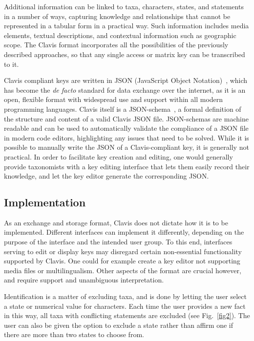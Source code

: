 \documentclass[10pt,letterpaper]{article}
\begin{document}
Additional information can be linked to taxa, characters, states, and statements in a number of ways, capturing knowledge and relationships that cannot be represented in a tabular form in a practical way. Such information includes media elements, textual descriptions, and contextual information such as geographic scope. The Clavis format incorporates all the possibilities of the previously described approaches, so that any single access or matrix key can be transcribed to it.

Clavis compliant keys are written in JSON (JavaScript Object Notation)~\cite{JSON}, which has become the \textit{de facto} standard for data exchange over the internet, as it is an open, flexible format with widespread use and support within all modern programming languages. Clavis itself is a JSON-schema~\cite{JSON_schema}, a formal definition of the structure and content of a valid Clavis JSON file. JSON-schemas are machine readable and can be used to automatically validate the compliance of a JSON file in modern code editors, highlighting any issues that need to be solved. While it is possible to manually write the JSON of a Clavis-compliant key, it is generally not practical. In order to facilitate key creation and editing, one would generally provide taxonomists with a key editing interface that lets them easily record their knowledge, and let the key editor generate the corresponding JSON.
\subsection*{
Implementation
}
As an exchange and storage format, Clavis does not dictate how it is to be implemented. Different interfaces can implement it differently, depending on the purpose of the interface and the intended user group. To this end, interfaces serving to edit or display keys may disregard certain non-essential functionality supported by Clavis. One could for example create a key editor not supporting media files or multilingualism. Other aspects of the format are crucial however, and require support and unambiguous interpretation.

Identification is a matter of excluding taxa, and is done by letting the user select a state or numerical value for characters. Each time the user provides a new fact in this way, all taxa with conflicting statements are excluded (see Fig.~\ref{fig2}). The user can also be given the option to exclude a state rather than affirm one if there are more than two states to choose from. 
\end{document}

